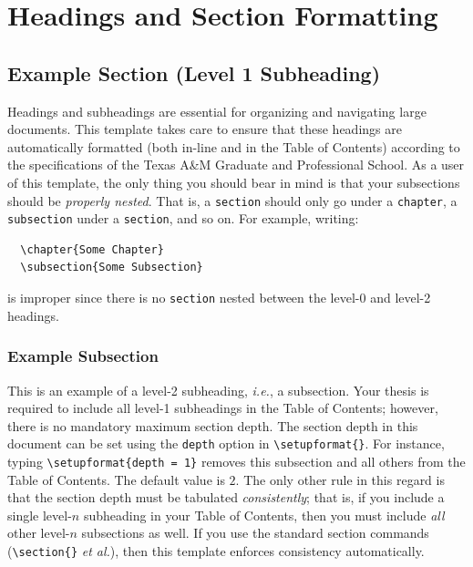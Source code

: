 \chapter{Headings and Section Formatting}\label{ch:headings}
\section{Example Section (Level 1 Subheading)}
Headings and subheadings are essential for organizing and navigating large documents.
This template takes care to ensure that these headings are automatically formatted (both in-line and in the Table of Contents) according to the specifications of the Texas A\&M Graduate and Professional School.
As a user of this template, the only thing you should bear in mind is that your subsections should be \textit{properly nested}.
That is, a \texttt{section} should only go under a \texttt{chapter}, a \texttt{subsection} under a \texttt{section}, and so on.
For example, writing:
\begin{verbatim}
  \chapter{Some Chapter}
  \subsection{Some Subsection}
\end{verbatim}
is improper since there is no \texttt{section} nested between the level-0 and level-2 headings.

\subsection{Example Subsection}
This is an example of a level-2 subheading, \textit{i.e.}, a subsection.
Your thesis is required to include all level-1 subheadings in the Table of Contents; however, there is no mandatory maximum section depth.
The section depth in this document can be set using the \texttt{depth} option in \verb|\setupformat{}|.
For instance, typing \verb|\setupformat{depth = 1}| removes this subsection and all others from the Table of Contents.
The default value is $2$.
The only other rule in this regard is that the section depth must be tabulated \textit{consistently}; that is, if you include a single level-$n$ subheading in your Table of Contents, then you must include \textit{all} other level-$n$ subsections as well.
If you use the standard section commands (\verb|\section{}| \textit{et al.}), then this template enforces consistency automatically.

